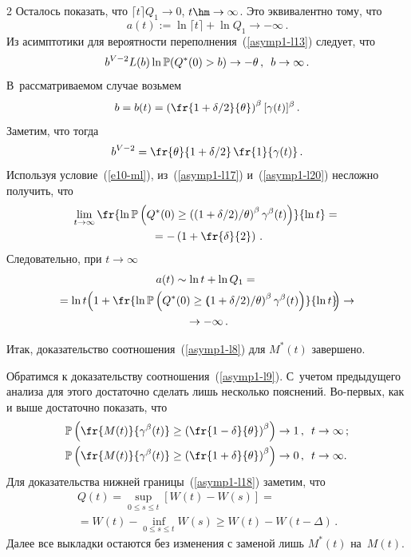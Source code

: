 \begin{multicols}{2}
Осталось показать, что $\lceil t \rceil Q_1 \to 0$, $t \hm\to \infty$. 
Это эквивалентно тому, что
$$
a(t):=\ln \lceil t \rceil + \ln Q_1 \to -\infty\,.
$$
 Из асимптотики для вероятности переполнения~(\ref{asymp1-l13}) следует, что
\begin{equation}
b^{V-2}L(b)\ln \mathbb{P}(Q^*(0)>b)\to   -\theta\,,\enskip b\to \infty\,.
\label{asymp1-l17}
\end{equation}
В~рассматриваемом случае возьмем
$$
b=b(t)=\left( \fr{1+{\delta}/{2}}{\theta} \right)^\beta[\gamma(t)]^\beta\,.
$$
Заметим, что тогда
\begin{equation}
b^{V-2}=\fr{\theta}{1+{\delta}/{2}}\, \fr{1}{\gamma(t)}\,. 
\label{asymp1-l20}
\end{equation}
Используя условие~(\ref{e10-ml}), из~(\ref{asymp1-l17})
и~(\ref{asymp1-l20}) несложно получить, что
\begin{multline*}
\lim\limits_{t \to \infty} \fr{\ln \mathbb{P} \left( Q^*(0) \geq \left(
(1+\delta/2)/{\theta}\right)^\beta \gamma^\beta(t)
\right)}{\ln t}={}\\
{}=-\left(1+\fr{\delta}{2}\right)\,.
\end{multline*}
Следовательно, при $t \to \infty$
\begin{multline*}
a(t) \sim \ln t + \ln Q_1={}\\
{}= \ln t\! \left( 1+\fr{\ln \mathbb{P} \left( Q^*(0) \geq \left(\!\!
(1+\delta/2)/{\theta}\right)^\beta \gamma^\beta(t) \right)}{\ln t}\!\!\right)\to{}\\
{}\to -\infty \,.
\end{multline*}

Итак, доказательство соотношения~(\ref{asymp1-l8}) для $M^*(t)$ завершено.

\smallskip

Обратимся к   доказательству соотношения~(\ref{asymp1-l9}). С~учетом предыдущего анализа для этого достаточно сделать лишь
несколько пояснений. Во-пер\-вых, как и выше достаточно показать,
что
\begin{align}
\mathbb{P} \left( \fr{M(t)}{\gamma^\beta(t)} \geq \left(
\fr{1-\delta}{\theta} \right)^\beta \right ) &\to 1\,,\enskip t \to \infty \,; \label{asymp1-l18}
\\
\mathbb{P} \left( \fr{M(t)}{\gamma^\beta(t)} \geq \left(
\fr{1+\delta}{\theta} \right)^\beta \right) &\to 0\,,\enskip t \to \infty. \label{asymp1-l19}
\end{align}
 Для доказательства нижней границы~(\ref{asymp1-l18}) заметим, что
\begin{multline*}
Q(t)=\sup\limits_{0\leq s \leq t}[W(t)-W(s)]={}\\
{}=W(t)-\inf\limits_{0\leq s \leq t} W(s)\geq
 W(t)-W(t-\Delta)\,.
\end{multline*}
Далее все выкладки остаются без изменения с заменой лишь $M^*(t)$ на~$M(t)$.


\end{multicols}
